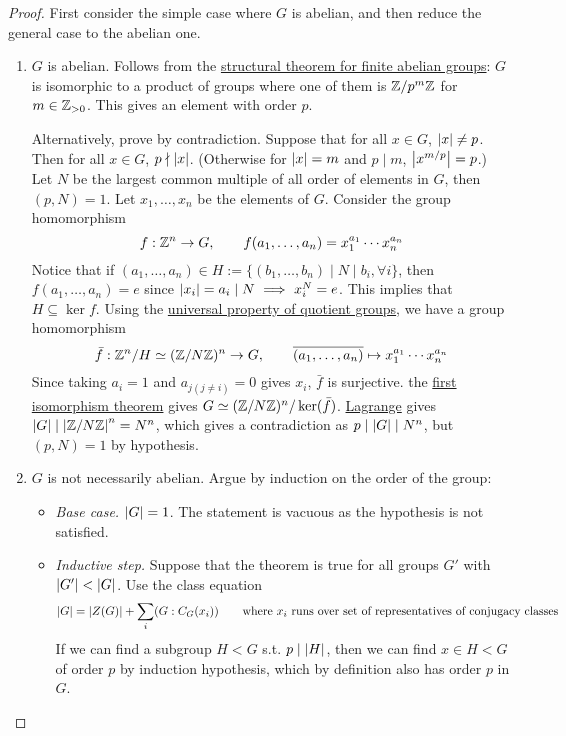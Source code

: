 \documentclass{article}
\begin{document}
\begin{proof}
    First consider the simple case where $G$ is abelian, and then reduce the general case to the abelian one.

    \begin{enumerate}
        \item[\bu{Case 1.}] $G$ is abelian. Follows from the \hyperref[thm: structural theorem]{structural theorem for finite abelian groups}: $G$ is isomorphic to a product of groups where one of them is $\mathbb{Z}/p^m\mathbb{Z}$ for $m \in \mathbb{Z}_{>0}$. This gives an element with order $p$.

        Alternatively, prove by contradiction. Suppose that for all $x \in G$, $\left|x\right| \neq p$. Then for all $x \in G$, $p \nmid \left|x\right|$. (Otherwise for $\left|x\right| = m$ and $p \mid m$, $\left|x^{m/p}\right| = p$.) Let $N$ be the largest common multiple of all order of elements in $G$, then $(p, N) = 1$. Let $x_1, \dots, x_n$ be the elements of $G$. Consider the group homomorphism 
        \[
            f: \mathbb{Z}^n \to G, \qquad f(a_1, \dots, a_n) = x_1^{a_1} \cdots x_n^{a_n}
        \]
        Notice that if $(a_1, \dots, a_n) \in H := \{(b_1, \dots, b_n) \mid N \mid b_i, \forall i\}$, then $f(a_1, \dots, a_n) = e$ since $\left|x_i\right| = a_i \mid N \ \Longrightarrow\  x_i^N = e$. This implies that $H \subseteq \ker f$. Using the \hyperref[prop: universal property of quotient group]{universal property of quotient groups}, we have a group homomorphism
        \[
            \bar{f}: \mathbb{Z}^n/H \simeq (\mathbb{Z}/N\mathbb{Z})^n \to G, \qquad \overline{(a_1, \dots, a_n)} \mapsto x_1^{a_1} \cdots x_n^{a_n}
        \]
        Since taking $a_i = 1$ and $a_{j(j \neq i)} = 0$ gives $x_i$, $\bar{f}$ is surjective. the \hyperref[thm: first isomorphism theorem]{first isomorphism theorem} gives $G \simeq (\mathbb{Z}/N\mathbb{Z})^n/\ker(\bar{f})$. \hyperref[thm: Lagrange]{Lagrange} gives $\left|G\right| \mid \left|\mathbb{Z}/N\mathbb{Z}\right|^n = N^n$, which gives a contradiction as $p \mid \left|G\right| \mid N^n$, but $(p, N) = 1$ by hypothesis.

        \item[\bu{Case 2.}] $G$ is not necessarily abelian. Argue by induction on the order of the group:
        \begin{itemize}
            \item \emph{Base case.} $\left|G\right| = 1$. The statement is vacuous as the hypothesis is not satisfied.
            \item \emph{Inductive step.} Suppose that the theorem is true for all groups $G'$ with $\left|G'\right| < \left|G\right|$. Use the class equation
            \[
                \left|G\right| = \left|Z(G)\right| + \sum_{i}(G : C_G(x_i)) \qquad \text{where $x_i$ runs over set of representatives of conjugacy classes}
            \]
            If we can find a subgroup $H < G$ s.t. $p \mid \left|H\right|$, then we can find $x \in H < G$ of order $p$ by induction hypothesis, which by definition also has order $p$ in $G$.


\end{itemize}
\end{enumerate}
\end{proof}
\end{document}
